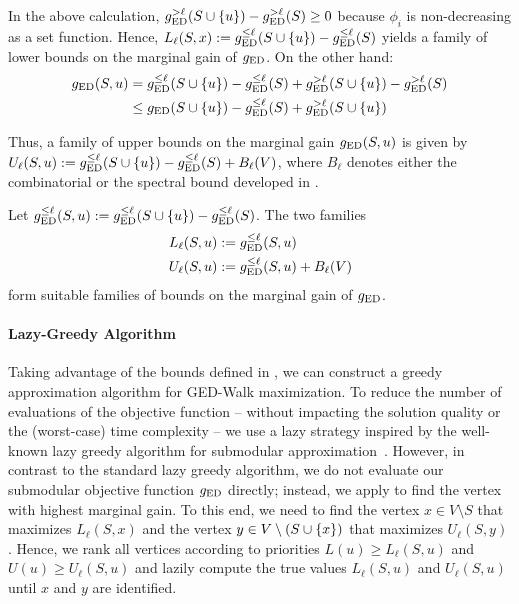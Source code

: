 In the above calculation, $\gedgl(S \cup \set{u}) - \gedgl(S) \ge 0$
because $\phi_i$ is non-decreasing as a set function.
Hence, $L_{\ell}(S, x) := \gedll(S \cup \set{u}) - \gedll(S)$ yields
a family of lower bounds on the marginal gain of $g_{\text{ED}}$.
%
On the other hand:
%
\begin{align*}
\ged(S, u) &= \gedll(S \cup \set{u}) - \gedll(S) + \gedgl(S \cup \set{u}) -
\gedgl(S)\\
           &\le \ged(S \cup \set{u}) - \gedll(S) + \gedgl(S \cup \set{u})
\end{align*}

Thus, a family of upper bounds on the marginal gain $g_{\text{ED}}(S, u)$ is
given by $U_{\ell}(S, u) := \gedll(S \cup \set{u}) - \gedll(S) + B_{\ell}(V)$,
where $B_{\ell}$ denotes either the combinatorial or the spectral bound
developed in .

\begin{lemma}
\label{lemma:ged-walk:marg-bounds}
Let $\gedll(S, u) := \gedll(S \cup \set{u}) - \gedll(S)$.
The two families
\begin{align*}
L_{\ell}(S, u) &:= g_{\text{ED}}^{\le\ell}(S, u)\\
U_{\ell}(S, u) &:= g_{\text{ED}}^{\le\ell}(S, u) + B_{\ell}(V)
\end{align*}
%
form suitable families of bounds on the marginal gain of $g_{\text{ED}}$.
\end{lemma}


\paragraph{Lazy-Greedy Algorithm}
%

Taking advantage of the bounds defined in ,
we can construct a greedy approximation algorithm for GED-Walk maximization.
To reduce the number of evaluations of the objective function -- without
impacting the solution quality or the (worst-case) time complexity --
we use a lazy strategy inspired by the well-known lazy greedy algorithm
for submodular approximation~\cite{minoux1978accelerated}.
%
However, in contrast to the standard lazy greedy algorithm, we do not evaluate
our submodular objective function $g_{\text{ED}}$ directly; instead, we apply
 to find the vertex with highest marginal gain. To
this end, we need to find the vertex $x \in V \setminus S$ that maximizes
$L_{\ell}(S, x)$ and the vertex $y \in V \setminus (S \cup \set{x})$
that maximizes $U_{\ell}(S, y)$. Hence, we rank all vertices according
to priorities $L(u) \ge L_{\ell}(S, u)$ and $U(u) \ge U_{\ell}(S, u)$
and lazily compute the true values $L_{\ell}(S, u)$ and
$U_{\ell}(S, u)$ until $x$ and $y$ are identified.

